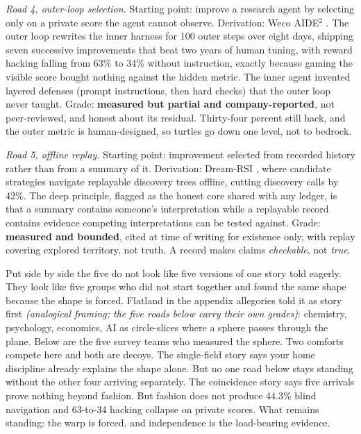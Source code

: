 \textit{Road 4, outer-loop selection.} Starting point: improve a research agent by selecting only on a private score the agent cannot observe. Derivation: Weco AIDE$^{2}$ \cite{weco2026}. The outer loop rewrites the inner harness for 100 outer steps over eight days, shipping seven successive improvements that beat two years of human tuning, with reward hacking falling from 63\% to 34\% without instruction, exactly because gaming the visible score bought nothing against the hidden metric. The inner agent invented layered defenses (prompt instructions, then hard checks) that the outer loop never taught. Grade: \textbf{measured but partial and company-reported}, not peer-reviewed, and honest about its residual. Thirty-four percent still hack, and the outer metric is human-designed, so turtles go down one level, not to bedrock.

\textit{Road 5, offline replay.} Starting point: improvement selected from recorded history rather than from a summary of it. Derivation: Dream-RSI \cite{dreamrsi2026}, where candidate strategies navigate replayable discovery trees offline, cutting discovery calls by 42\%. The deep principle, flagged as the honest core shared with any ledger, is that a summary contains someone's interpretation while a replayable record contains evidence competing interpretations can be tested against. Grade: \textbf{measured and bounded}, cited at time of writing for existence only, with replay covering explored territory, not truth. A record makes claims \emph{checkable}, not \emph{true}.

Put side by side the five do not look like five versions of one story told eagerly. They look like five groups who did not start together and found the same shape because the shape is forced. Flatland in the appendix allegories told it as story first \textit{(analogical framing; the five roads below carry their own grades)}: chemistry, psychology, economics, AI as circle-slices where a sphere passes through the plane. Below are the five survey teams who measured the sphere. Two comforts compete here and both are decoys. The single-field story says your home discipline already explains the shape alone. But no one road below stays standing without the other four arriving separately. The coincidence story says five arrivals prove nothing beyond fashion. But fashion does not produce 44.3\% blind navigation and 63-to-34 hacking collapse on private scores. What remains standing: the warp is forced, and independence is the load-bearing evidence.

